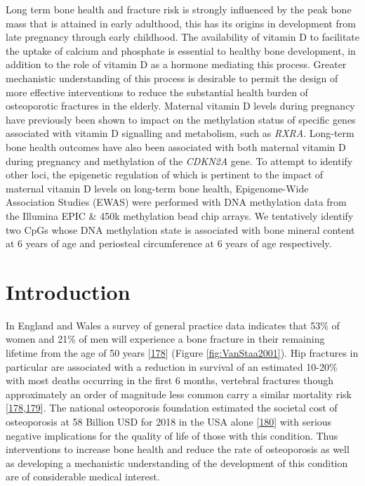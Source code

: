 \documentclass[
]{book}
\begin{document}
Long term bone health and fracture risk is strongly influenced by the peak bone mass that is attained in early adulthood, this has its origins in development from late pregnancy through early childhood.
The availability of vitamin D to facilitate the uptake of calcium and phosphate is essential to healthy bone development, in addition to the role of vitamin D as a hormone mediating this process.
Greater mechanistic understanding of this process is desirable to permit the design of more effective interventions to reduce the substantial health burden of osteoporotic fractures in the elderly.
Maternal vitamin D levels during pregnancy have previously been shown to impact on the methylation status of specific genes associated with vitamin D signalling and metabolism, such as \emph{RXRA}.
Long-term bone health outcomes have also been associated with both maternal vitamin D during pregnancy and methylation of the \emph{CDKN2A} gene.
To attempt to identify other loci, the epigenetic regulation of which is pertinent to the impact of maternal vitamin D levels on long-term bone health, Epigenome-Wide Association Studies (EWAS) were performed with DNA methylation data from the Illumina EPIC \& 450k methylation bead chip arrays.
We tentatively identify two CpGs whose DNA methylation state is associated with bone mineral content at 6 years of age and periosteal circumference at 6 years of age respectively.

\hypertarget{introduction-1}{%
\section{Introduction}\label{introduction-1}}

In England and Wales a survey of general practice data indicates that 53\% of women and 21\% of men will experience a bone fracture in their remaining lifetime from the age of 50 years {[}\protect\hyperlink{ref-VanStaa2001}{178}{]} (Figure \ref{fig:VanStaa2001}).
Hip fractures in particular are associated with a reduction in survival of an estimated 10-20\% with most deaths occurring in the first 6 months, vertebral fractures though approximately an order of magnitude less common carry a similar mortality risk {[}\protect\hyperlink{ref-VanStaa2001}{178},\protect\hyperlink{ref-Streubel2011}{179}{]}.
The national osteoporosis foundation estimated the societal cost of osteoporosis at 58 Billion USD for 2018 in the USA alone {[}\protect\hyperlink{ref-Thompson2018}{180}{]} with serious negative implications for the quality of life of those with this condition.
Thus interventions to increase bone health and reduce the rate of osteoporosis as well as developing a mechanistic understanding of the development of this condition are of considerable medical interest.
\end{document}

